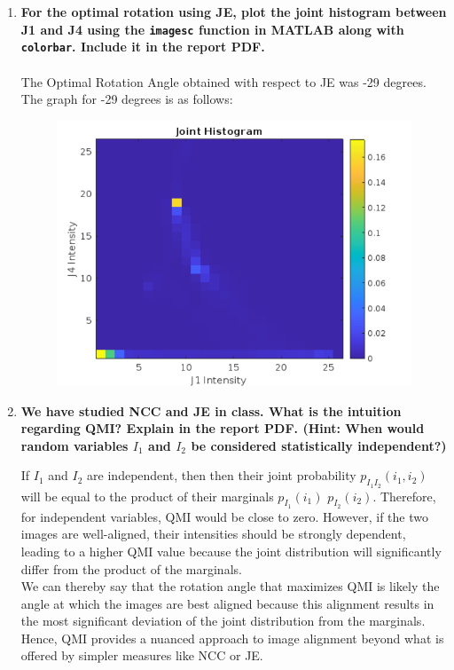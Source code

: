 \documentclass{article}
\begin{document}
\begin{enumerate}
\begin{enumerate}
\item \textbf{For the optimal rotation using JE, plot the joint histogram between J1 and J4 using the \texttt{imagesc} function in MATLAB along with \texttt{colorbar}. Include it in the report PDF.}
\\
\\
The Optimal Rotation Angle obtained with respect to JE was -29 degrees. The graph for -29 degrees is as follows:
\begin{figure}[!h]
    \centering
    \includegraphics[width=0.46\linewidth]{JointHisto.png}
\end{figure}
\FloatBarrier
\item \textbf{We have studied NCC and JE in class. What is the intuition regarding QMI? Explain in the report PDF. (Hint: When would random variables $I_1$ and $I_2$ be considered statistically independent?) }


If $I_1$ and $I_2$ are independent, then then their joint probability $p_{I_{1}I_{2}}(i_{1},i_{2})$ will be equal to the product of their marginals $p_{I_{1}}(i_{1})$ $p_{I_{2}}(i_{2})$. Therefore, for independent variables, QMI would be close to zero. However, if the two images are well-aligned, their intensities should be strongly dependent, leading to a higher QMI value because the joint distribution will significantly differ from the product of the marginals. \\
We can thereby say that the rotation angle that maximizes QMI is likely the angle at which the images are best aligned because this alignment results in the most significant deviation of the joint distribution from the marginals. Hence, QMI provides a nuanced approach to image alignment beyond what is offered by simpler measures like NCC or JE.
\end{enumerate}
\newpage


\end{enumerate}
\end{document}
